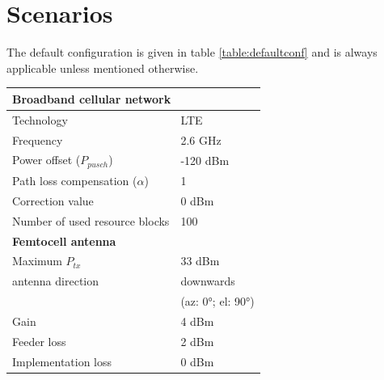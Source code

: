 \documentclass[twocolumn]{phdsymp} %
\begin{document}
\FloatBarrier
\section{Scenarios}
The default configuration is given in table \ref{table:defaultconf} and is always applicable unless mentioned otherwise. 

\begin{table}[!htb]
\centering
\begin{tabular}[t]{ll}
        \toprule
        \multicolumn{2}{l}{\textbf{Broadband cellular network}} \\
        \hline
        \hspace{3mm}  Technology                          & LTE     \\
        \hspace{3mm}  Frequency                           & 2.6 GHz \\
        \hspace{3mm}  Power offset ($P_{pusch}$)            & -120 dBm  \\
        \hspace{3mm}  Path loss compensation ($\alpha$)   & 1  \\
        \hspace{3mm}  Correction value                    & 0 dBm  \\
        \hspace{3mm}  Number of used resource blocks      & 100  \\
        \hline
        \multicolumn{2}{l}{\textbf{Femtocell antenna}} \\
        \hline  
        \hspace{3mm}  Maximum $P_{tx}$                    & 33 dBm   \\
        \hspace{3mm}  antenna  direction                  & downwards   \\ 
        \hspace{3mm}                                      & (az: \ang{0}; el: \ang{90})    \\
        \hspace{3mm}  Gain                                & 4 dBm   \\ 
        \hspace{3mm}  Feeder loss                         & 2 dBm   \\ 
        \hspace{3mm}  Implementation loss                 & 0 dBm   \\

\end{tabular}
\end{table}
\end{document}
